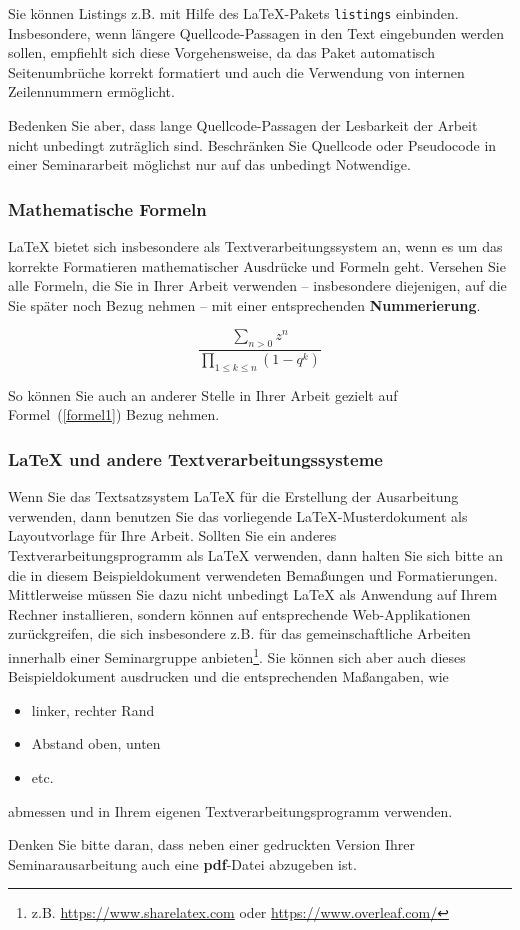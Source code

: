 Sie können Listings z.B. mit Hilfe des \LaTeX-Pakets {\tt listings} einbinden.
Insbesondere, wenn längere Quellcode-Passagen in den Text eingebunden werden sollen, empfiehlt sich diese Vorgehensweise, da das Paket automatisch Seitenumbrüche korrekt formatiert und auch die Verwendung von internen Zeilennummern ermöglicht.

\smallskip

Bedenken Sie aber, dass lange Quellcode-Passagen der Lesbarkeit der Arbeit nicht unbedingt zuträglich sind.
Beschränken Sie Quellcode oder Pseudocode in einer Seminararbeit möglichst nur auf das unbedingt Notwendige.

\subsubsection{Mathematische Formeln}

{\LaTeX} bietet sich insbesondere als Textverarbeitungssystem an, wenn es um das korrekte Formatieren mathematischer Ausdrücke und Formeln geht.
Versehen Sie alle Formeln, die Sie in Ihrer Arbeit verwenden -- insbesondere diejenigen, auf die Sie später noch Bezug nehmen --  mit einer entsprechenden \textbf{Nummerierung}.

\begin{equation}\label{formel1}
\frac{\sum_{n > 0} z^n}
{\prod_{1\leq k\leq n} (1-q^k)}
\end{equation}

So können Sie auch an anderer Stelle in Ihrer Arbeit gezielt auf Formel~(\ref{formel1}) Bezug nehmen.

\subsubsection{{\LaTeX} und andere Textverarbeitungssysteme}
Wenn Sie das Textsatzsystem {\LaTeX} für die Erstellung der Ausarbeitung verwenden, dann benutzen Sie das vorliegende \LaTeX-Musterdokument als Layoutvorlage für Ihre Arbeit.
Sollten Sie ein anderes Textverarbeitungsprogramm als {\LaTeX} verwenden, dann halten Sie sich bitte an die in diesem Beispieldokument verwendeten Bemaßungen und Formatierungen.
Mittlerweise müssen Sie dazu nicht unbedingt {\LaTeX} als Anwendung auf Ihrem Rechner installieren, sondern können auf entsprechende Web-Applikationen zurückgreifen, die sich insbesondere z.B. für das gemeinschaftliche Arbeiten innerhalb einer Seminargruppe anbieten\footnote{z.B. \url{https://www.sharelatex.com} oder \url{https://www.overleaf.com/}}.
Sie können sich aber auch dieses Beispieldokument ausdrucken und die entsprechenden Maßangaben, wie 
\begin{itemize}
\item linker, rechter Rand
\item Abstand oben, unten
\item etc.
\end{itemize}
abmessen und in Ihrem eigenen Textverarbeitungsprogramm verwenden. 

\smallskip

Denken Sie bitte daran, dass neben einer gedruckten Version Ihrer Seminarausarbeitung auch eine {\bf pdf}-Datei abzugeben ist.

